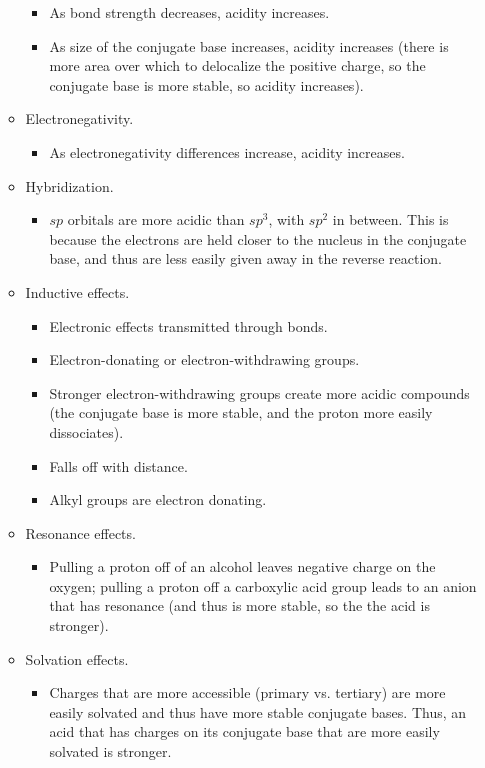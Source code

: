 \documentclass[../notes.tex]{subfiles}
\begin{document}
\begin{itemize}
\begin{itemize}
\begin{itemize}
            \item As bond strength decreases, acidity increases.
            \item As size of the conjugate base increases, acidity increases (there is more area over which to delocalize the positive charge, so the conjugate base is more stable, so acidity increases).
        \end{itemize}
        \item Electronegativity.
        \begin{itemize}
            \item As electronegativity differences increase, acidity increases.
        \end{itemize}
        \item Hybridization.
        \begin{itemize}
            \item $sp$ orbitals are more acidic than $sp^3$, with $sp^2$ in between. This is because the electrons are held closer to the nucleus in the conjugate base, and thus are less easily given away in the reverse reaction.
        \end{itemize}
        \item Inductive effects.
        \begin{itemize}
            \item Electronic effects transmitted through bonds.
            \item Electron-donating or electron-withdrawing groups.
            \item Stronger electron-withdrawing groups create more acidic compounds (the conjugate base is more stable, and the proton more easily dissociates).
            \item Falls off with distance.
            \item Alkyl groups are electron donating.
        \end{itemize}
        \item Resonance effects.
        \begin{itemize}
            \item Pulling a proton off of an alcohol leaves negative charge on the oxygen; pulling a proton off a carboxylic acid group leads to an anion that has resonance (and thus is more stable, so the the acid is stronger).
        \end{itemize}
        \item Solvation effects.
        \begin{itemize}
            \item Charges that are more accessible (primary vs. tertiary) are more easily solvated and thus have more stable conjugate bases. Thus, an acid that has charges on its conjugate base that are more easily solvated is stronger.
        \end{itemize}
    \end{itemize}
\end{itemize}
\end{document}
